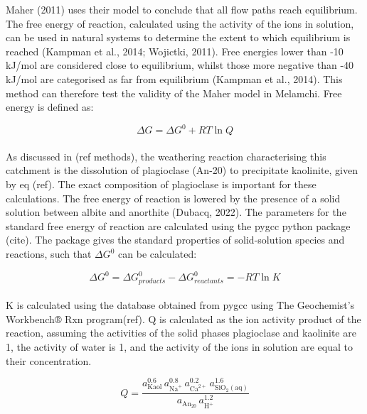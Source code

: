 Maher (2011) uses their model to conclude that all flow paths reach equilibrium. The free energy of reaction, calculated using the activity of the ions in solution, can be used in natural systems to determine the extent to which equilibrium is reached (Kampman et al., 2014; Wojictki, 2011). Free energies lower than -10 kJ/mol are considered close to equilibrium, whilst those more negative than -40 kJ/mol are categorised as far from equilibrium (Kampman et al., 2014). This method can therefore test the validity of the Maher model in Melamchi. Free energy is defined as:

\begin{equation}
    \Delta G = \Delta G^0 + RT \ln Q
\end{equation}\\

As discussed in  (ref methods), the weathering reaction characterising this catchment is the dissolution of plagioclase (An-20) to precipitate kaolinite, given by eq (ref). The exact composition of plagioclase is important for these calculations. The free energy of reaction is lowered by the presence of a solid solution between albite and anorthite (Dubacq, 2022). The parameters for the standard free energy of reaction are calculated using the pygcc python package (cite). The package gives the standard properties of solid-solution species and reactions, such that $\Delta G^0$ can be calculated:

\begin{equation}
    \Delta G^0 = \Delta G^0_{products} - \Delta G^0_{reactants} = -RT \ln K
\end{equation}\\

K is calculated using the database obtained from pygcc using The Geochemist's Workbench® Rxn program(ref). Q is calculated as the ion activity product of the reaction, assuming the activities of the solid phases plagioclase and kaolinite are 1, the activity of water is 1, and the activity of the ions in solution are equal to their concentration.

\begin{equation}
    Q = \frac{a_{\mathrm{Kaol}}^{0.6}\,a_{\mathrm{Na}^{+}}^{0.8}\,a_{\mathrm{Ca}^{2+}}^{0.2}\,a_{\mathrm{SiO_{2}(aq)}}^{1.6}}
           {a_{\mathrm{An_{20}}}\,a_{\mathrm{H}^{+}}^{1.2}}
\end{equation}\\


